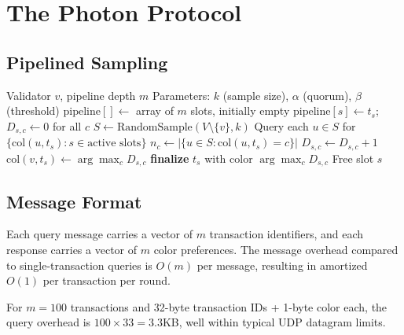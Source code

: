 \section{The Photon Protocol}

\label{sec:photon-protocol}

\subsection{Pipelined Sampling}

\begin{algorithm}[H]
\caption{Photon Protocol --- Pipelined Consensus}
\label{alg:photon-photon-core}
\begin{algorithmic}[1]
\Require Validator $v$, pipeline depth $m$
\Require Parameters: $k$ (sample size), $\alpha$ (quorum), $\beta$ (threshold)
\State $\text{pipeline}[] \gets$ array of $m$ slots, initially empty
\Loop
    \State {}
            \State $\text{pipeline}[s] \gets t_s$; $D_{s,c} \gets 0$ for all $c$
        \EndIf
    \EndFor
    \State $S \gets \text{RandomSample}(V \setminus \{v\}, k)$
    \State {}
    \State Query each $u \in S$ for $\{\text{col}(u, t_s) : s \in \text{active slots}\}$
            \State $n_c \gets |\{u \in S : \text{col}(u, t_s) = c\}|$
                \State $D_{s,c} \gets D_{s,c} + 1$
            \EndIf
        \EndFor
        \State $\text{col}(v, t_s) \gets \arg\max_c D_{s,c}$
            \State \textbf{finalize} $t_s$ with color $\arg\max_c D_{s,c}$
            \State Free slot $s$
        \EndIf
    \EndFor
\EndLoop
\end{algorithmic}
\end{algorithm}

\subsection{Message Format}

Each query message carries a vector of $m$ transaction identifiers, and each response
carries a vector of $m$ color preferences. The message overhead compared to single-transaction
queries is $O(m)$ per message, resulting in amortized $O(1)$ per transaction per round.

For $m = 100$ transactions and 32-byte transaction IDs + 1-byte color each, the query
overhead is $100 \times 33 = 3.3$KB, well within typical UDP datagram limits.

